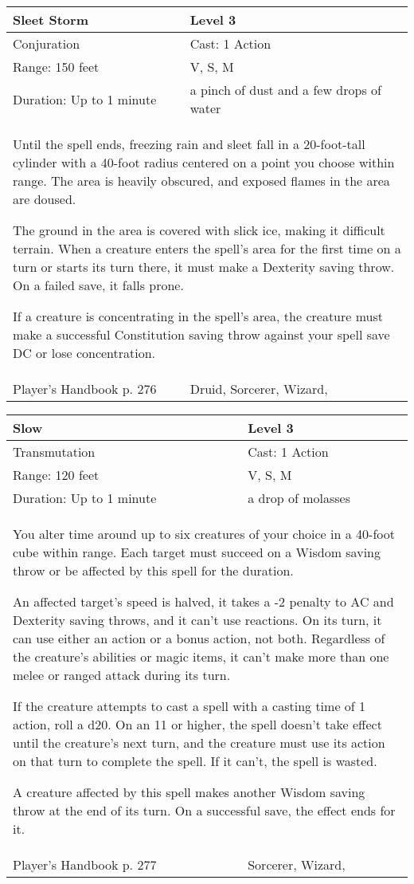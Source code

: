 \documentclass[11pt]{report}
\begin{document}
\begin{table}[H]
	\begin{tabular}{||p{6cm}|p{6cm}||}
		\hline\hline
		\bf{Sleet Storm} & Level 3\\ \hline
		Conjuration & Cast: 1 Action\\ \hline
		Range: 150 feet & V, S, M\\ \hline
		Duration: Up to 1 minute & a pinch of dust and a few drops of water\\ \hline
		\multicolumn{2}{||p{12cm}||}{Until the spell ends, freezing rain and sleet fall in a 20-foot-tall cylinder with a 40-foot radius centered on a point you choose within range. The area is heavily obscured, and exposed flames in the area are doused.

The ground in the area is covered with slick ice, making it difficult terrain. When a creature enters the spell’s area for the first time on a turn or starts its turn there, it must make a Dexterity saving throw. On a failed save, it falls prone.

If a creature is concentrating in the spell’s area, the creature must make a successful Constitution saving throw against your spell save DC or lose concentration.}\\ \hline
Player's Handbook p. 276 & Druid, Sorcerer, Wizard, \\ \hline\hline
	\end{tabular}
\end{table}

\begin{table}[H]
	\begin{tabular}{||p{6cm}|p{6cm}||}
		\hline\hline
		\bf{Slow} & Level 3\\ \hline
		Transmutation & Cast: 1 Action\\ \hline
		Range: 120 feet & V, S, M\\ \hline
		Duration: Up to 1 minute & a drop of molasses\\ \hline
		\multicolumn{2}{||p{12cm}||}{You alter time around up to six creatures of your choice in a 40-foot cube within range. Each target must succeed on a Wisdom saving throw or be affected by this spell for the duration.

An affected target’s speed is halved, it takes a -2 penalty to AC and Dexterity saving throws, and it can’t use reactions. On its turn, it can use either an action or a bonus action, not both. Regardless of the creature’s abilities or magic items, it can’t make more than one melee or ranged attack during its turn.

If the creature attempts to cast a spell with a casting time of 1 action, roll a d20. On an 11 or higher, the spell doesn’t take effect until the creature’s next turn, and the creature must use its action on that turn to complete the spell. If it can’t, the spell is wasted.

A creature affected by this spell makes another Wisdom saving throw at the end of its turn. On a successful save, the effect ends for it.}\\ \hline
Player's Handbook p. 277 & Sorcerer, Wizard, \\ \hline\hline
	\end{tabular}
\end{table}
\end{document}
